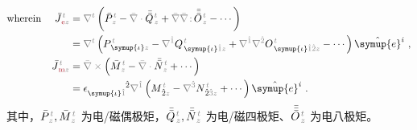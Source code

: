 \begin{subequations} \label{eq:J-em}
	\abovedisplayskip=8pt
	\belowdisplayskip=10pt
\begin{align}
	\text{wherein}~~~~ \bar{J}^{\;\!\mathcolor{gray}{t}}_{\;\!\textcolor{Maroon}{\text{e}}\mathcolor{gray}{z}} &= \mathcolor{gray}{\nabla^t} \left( \bar{P}^{\;\!\mathcolor{gray}{t}}_{\;\!\mathcolor{gray}{z}} - \mathcolor{gray}{\bar{\nabla} \cdot} \bar{\bar{Q}}^{\;\!\mathcolor{gray}{t}}_{\;\!\mathcolor{gray}{z}} + \mathcolor{gray}{\bar{\nabla}} \mathcolor{gray}{\bar{\nabla} \colon}\! \bar{\bar{\bar{O}}}^{\;\!\mathcolor{gray}{t}}_{\;\!\mathcolor{gray}{z}} - \cdots \right) \label{eq:J-e} \\ 
	&= \mathcolor{gray}{\nabla^t} \left( P^{\;\!\mathcolor{gray}{t}}_{\;\! \symup{\iota}\mathcolor{gray}{z}} - \mathcolor{gray}{\nabla^{\hat{1}}} Q^{\;\!\mathcolor{gray}{t}}_{\;\! \symup{\iota} \mathcolor{gray}{\hat{1}} \mathcolor{gray}{z}} + \mathcolor{gray}{\nabla^{\hat{1}}} \mathcolor{gray}{\nabla^{\hat{2}}} O^{\;\!\mathcolor{gray}{t}}_{\;\! \symup{\iota} \mathcolor{gray}{\hat{1}\hat{2}} \mathcolor{gray}{z}} - \cdots \right) \hat{\symup{e}}^i~, \label{eq:j-e} \\ 
	\bar{J}^{\;\!\mathcolor{gray}{t}}_{\;\!\textcolor{Maroon}{\text{m}}\mathcolor{gray}{z}} &= \mathcolor{gray}{\bar{\nabla} \times} \left( \bar{M}^{\;\!\mathcolor{gray}{t}}_{\;\!\mathcolor{gray}{z}} - \mathcolor{gray}{\bar{\nabla} \cdot} \bar{\bar{N}}^{\;\!\mathcolor{gray}{t}}_{\;\!\mathcolor{gray}{z}} + \cdots \right) \label{eq:J-m} \\ 
	&= \epsilon^{\hphantom{\symup{\iota}\hat{1}}\hat{2}}_{\symup{\iota}\mathcolor{gray}{\hat{1}}} \mathcolor{gray}{\nabla^{\hat{1}}} \left( M^{\;\!\mathcolor{gray}{t}}_{\;\! \hat{2}\mathcolor{gray}{z}} - \mathcolor{gray}{\nabla^{\hat{3}}} N^{\;\!\mathcolor{gray}{t}}_{\;\! \hat{2} \mathcolor{gray}{\hat{3}} \mathcolor{gray}{z}} + \cdots \right) \hat{\symup{e}}^i~. \label{eq:j-m}
\end{align}
\end{subequations}
其中，$\bar{P}^{\;\!\mathcolor{gray}{t}}_{\;\!\mathcolor{gray}{z}}, \bar{M}^{\;\!\mathcolor{gray}{t}}_{\;\!\mathcolor{gray}{z}}$ 为电/磁偶极矩，$\bar{\bar{Q}}^{\;\!\mathcolor{gray}{t}}_{\;\!\mathcolor{gray}{z}}, \bar{\bar{N}}^{\;\!\mathcolor{gray}{t}}_{\;\!\mathcolor{gray}{z}}$ 为电/磁四极矩、$\bar{\bar{\bar{O}}}^{\;\!\mathcolor{gray}{t}}_{\;\!\mathcolor{gray}{z}}$ 为电八极矩。


